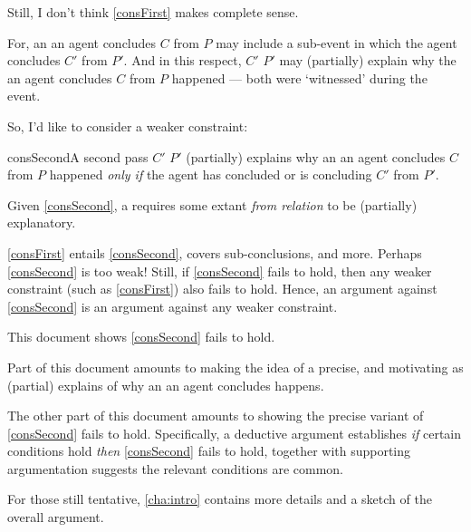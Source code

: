 \begin{note}
  Still, I don't think \autoref{consFirst} makes complete sense.

  For, an  an agent concludes \(C\) from \(P\) may include a sub-event in which the agent concludes \(C'\) from \(P'\).
  And in this respect, \(C'\) \fingf{} \(P'\) may (partially) explain why the  an agent concludes \(C\) from \(P\) happened --- both  were `witnessed' during the event.

  So, I'd like to consider a weaker constraint:

  \begin{constraint}{consSecond}{A second pass}
    \(C'\) \fingf{} \(P'\) (partially) explains why an  an agent concludes \(C\) from \(P\) happened \emph{only if} the agent has concluded or is concluding \(C'\) from \(P'\).
  \end{constraint}

  \noindent%
  Given \autoref{consSecond}, a \emph{\fingfr{}} requires some extant \emph{from relation} to be (partially) explanatory.
\end{note}


\begin{note}
  \autoref{consFirst} entails \autoref{consSecond}, covers sub-conclusions, and more.
  Perhaps \autoref{consSecond} is too weak!
  Still, if \autoref{consSecond} fails to hold, then any weaker constraint (such as \autoref{consFirst}) also fails to hold.
  Hence, an argument against \autoref{consSecond} is an argument against any weaker constraint.
\end{note}

\begin{note}
  This document shows \autoref{consSecond} fails to hold.

  Part of this document amounts to making the idea of a \fingfr{} precise, and motivating  as (partial) explains of why an \eiw{} an agent concludes happens.

  The other part of this document amounts to showing the precise variant of \autoref{consSecond} fails to hold.
  Specifically, a deductive argument establishes \emph{if} certain conditions hold \emph{then} \autoref{consSecond} fails to hold, together with supporting argumentation suggests the relevant conditions are common.

  For those still tentative, \autoref{cha:intro} contains more details and a sketch of the overall argument.
\end{note}


